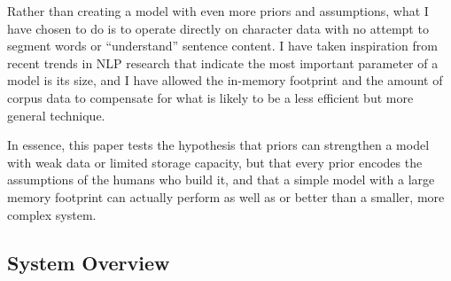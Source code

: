 \documentclass[11pt]{ctexart}
\begin{document}
Rather than creating a model with even more priors and 
assumptions, what I have chosen to do is to operate directly on character data with no
attempt to segment words or ``understand'' sentence content. I have taken 
inspiration from recent trends in NLP research that indicate
the most important parameter of a model is its size, and I have
allowed the in-memory footprint and the amount of corpus data to compensate
for what is likely to be a less efficient but more general technique.

In essence, this paper tests the hypothesis that 
priors can strengthen a model with weak data or limited
storage capacity, but that every prior encodes the assumptions 
of the humans who build it, and that a simple model with a large memory footprint
can actually perform as well as or better than a smaller, more complex system.

\subsection{System Overview}
\end{document}
